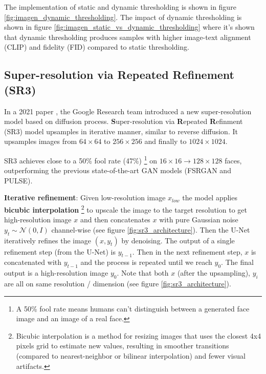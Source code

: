The implementation of static and dynamic thresholding is shown in figure \ref{fig:imagen_dynamic_thresholding}. The impact of dynamic thresholding is shown in figure \ref{fig:imagen_static_vs_dynamic_thresholding} where it's shown that dynamic thresholding produces samples with higher image-text alignment (CLIP) and fidelity (FID) compared to static thresholding.
















\subsection{Super-resolution via Repeated Refinement (SR3)}

\label{subsec:imagen_sr3}

In a 2021 paper \cite{sr3}, the Google Research team introduced a new super-resolution model based on diffusion process. \textbf{S}uper-resolution via \textbf{R}epeated \textbf{R}efinment (SR3) model upsamples in iterative manner, similar to reverse diffusion. It upsamples images from $64\times 64$ to $256\times 256$ and finally to $1024\times 1024$.

SR3 achieves close to a 50\% fool rate (47\%) \footnote{A 50\% fool rate means humans can't distinguish between a generated face image and an image of a real face.} on $16\times 16 \rightarrow 128\times 128$ faces, outperforming the previous state-of-the-art GAN models (FSRGAN and PULSE).

\textbf{Iterative refinement}: Given low-resolution image $x_{low}$ the model applies \textbf{bicubic interpolation} \footnote{Bicubic interpolation is a method for resizing images that uses the closest 4x4 pixels grid to estimate new values, resulting in smoother transitions (compared to nearest-neighbor or bilinear interpolation) and fewer visual artifacts.} to upscale the image to the target resolution to get high-resolution image $x$ and then concatenates $x$ with pure Gaussian noise $y_t \sim \mathcal{N} (0, I)$ channel-wise (see figure \ref{fig:sr3_architecture}). Then the U-Net iteratively refines the image $(x, y_t)$ by denoising. The output of a single refinement step (from the U-Net) is $y_{t-1}$. Then in the next refinement step, $x$ is concatenated with $y_{t-1}$ and the process is repeated until we reach $y_0$. The final output is a high-resolution image $y_0$. Note that both $x$ (after the upsampling), $y_i$ are all on same resolution / dimension (see figure \ref{fig:sr3_architecture}).

